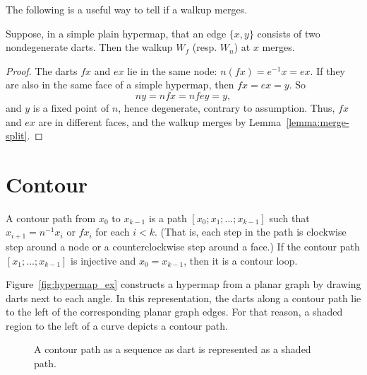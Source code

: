The following is a useful way to tell if a walkup merges.


\begin{lemma}  
Suppose, in a simple plain hypermap, that an edge $\{x,y\}$ consists of two nondegenerate darts.  Then the walkup  $W_f$ (resp. $W_n$) at $x$  merges.
\end{lemma}

\begin{proof} 
The darts $f x$ and $e x$ lie in the same node: $n (f x) = e^{-1} x = e x$. If they are also in the same face of a simple hypermap, then $f x = e x
= y$. So 
  $$n y  = n f x = n f e y = y,$$
and $y$ is a fixed
point of $n$, hence degenerate, contrary to assumption.  
Thus, $f x$ and $e x$ are in different faces, and the walkup merges
by Lemma~\ref{lemma:merge-split}.  
\end{proof}




\section{Contour}


\begin{definition}  A contour path from $x_0$ to $x_{k-1}$ is a path  $[x_0;x_1;\ldots;x_{k-1}]$ such that $x_{i+1} = n^{-1} x_i$ or $f x_i$ for each $i<k$.  (That is, each step in the path is clockwise step around a node or a counterclockwise step around a face.)   If the contour path $[x_1;\ldots;x_{k-1}]$ is injective and  $x_0 = x_{k-1}$, then it is a contour loop.
\end{definition}

\begin{remark}  Figure~\ref{fig:hypermap_ex} constructs a hypermap from a planar graph by drawing darts next to each angle.  In this representation, the darts along a contour path lie to the left of the corresponding planar graph edges.  For that reason, a shaded region to the left of a curve depicts a contour path.
\end{remark}

\begin{figure}[htb]
  \centering
  \caption{A contour path as a sequence as dart is represented as a shaded path.}
  \label{fig:shade-dart}
\end{figure}

